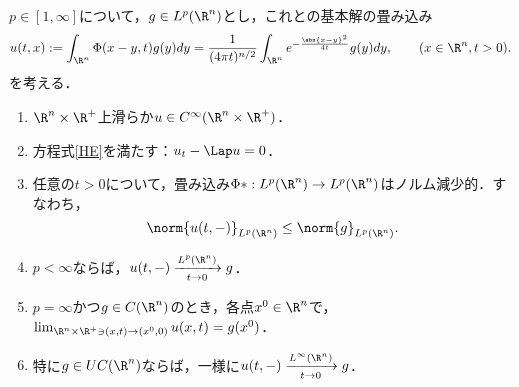 \documentclass[uplatex,dvipdfmx]{jsreport}
\begin{document}
\begin{theorem}\label{thm-solution-for-HHE}
    $p\in[1,\infty]$について，$g\in L^p(\R^n)$とし，これとの基本解の畳み込み
    \[u(t,x):=\int_{\R^n}\Phi(x-y,t)g(y)dy=\frac{1}{(4\pi t)^{n/2}}\int_{\R^n}e^{-\frac{\abs{x-y}^2}{4t}}g(y)dy,\qquad(x\in\R^n,t>0).\]
    を考える．
    \begin{enumerate}
        \item $\R^n\times\R^+$上滑らか$u\in C^\infty(\R^n\times\R^+)$．
        \item 方程式\ref{HE}を満たす：$u_t-\Lap u=0$．
        \item 任意の$t>0$について，畳み込み$\Phi*:L^p(\R^n)\to L^p(\R^n)$はノルム減少的．すなわち，
        \[\norm{u(t,-)}_{L^p(\R^n)}\le\norm{g}_{L^p(\R^n)}.\]
        \item $p<\infty$ならば，$u(t,-)\xrightarrow[t\to0]{L^p(\R^n)}g$．
        \item $p=\infty$かつ$g\in C(\R^n)$のとき，各点$x^0\in\R^n$で，$\lim_{\R^n\times\R^+\ni(x,t)\to(x^0,0)}u(x,t)=g(x^0)$．
        \item 特に$g\in UC(\R^n)$ならば，一様に$u(t,-)\xrightarrow[t\to0]{L^\infty(\R^n)}g$．
    \end{enumerate}
\end{theorem}
\end{document}
